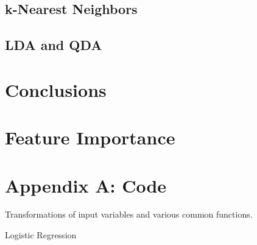 \documentclass{article}
\begin{document}
\subsection{k-Nearest Neighbors}



\subsection{LDA and QDA}



\section{Conclusions}



\section{Feature Importance}



\newpage

\section*{Appendix A: Code}

Transformations of input variables and various common functions.



Logistic Regression


\end{document}
